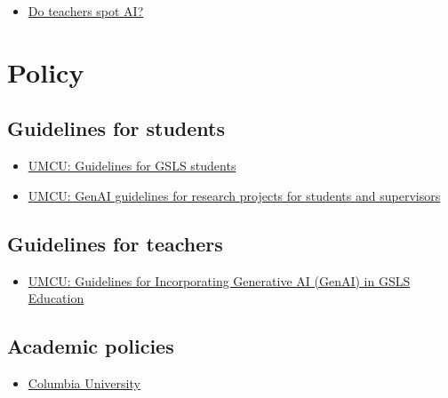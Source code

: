 \documentclass[
  letterpaper,
  DIV=11,
  numbers=noendperiod]{scrreprt}
\providecommand{\tightlist}{%
  \setlength{\itemsep}{0pt}\setlength{\parskip}{0pt}}\usepackage{longtable,booktabs,array}
\begin{document}
\begin{itemize}
\tightlist
\item
  \href{https://www.sciencedirect.com/science/article/pii/S2666920X24000109?dgcid=raven_sd_aip_email}{Do
  teachers spot AI?}
\end{itemize}

\section{Policy}\label{policy-1}

\subsection{Guidelines for students}\label{guidelines-for-students}

\begin{itemize}
\tightlist
\item
  \href{https://students.uu.nl/en/gsls/practical-information/generative-ai-guidelines}{UMCU:
  Guidelines for GSLS students}
\item
  \href{https://students.uu.nl/sites/default/files/GSLS\%20GenAI\%20Research\%20Guidelines\%20for\%20Students\%20and\%20SupervisorsGSLS\%20GenAI\%20Research\%20Guidelines.pdf}{UMCU:
  GenAI guidelines for research projects for students and supervisors}
\end{itemize}

\subsection{Guidelines for teachers}\label{guidelines-for-teachers}

\begin{itemize}
\tightlist
\item
  \href{https://teachersguidegsls.nl/teaching-courses/generative-ai-guidelines/}{UMCU:
  Guidelines for Incorporating Generative AI (GenAI) in GSLS Education}
\end{itemize}

\subsection{Academic policies}\label{academic-policies}

\begin{itemize}
\tightlist
\item
  \href{https://provost.columbia.edu/content/office-senior-vice-provost/ai-policy}{Columbia
  University}
\end{itemize}
\end{document}
